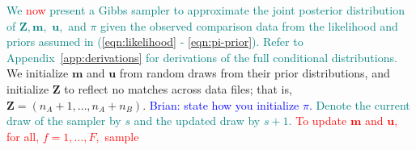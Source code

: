 \documentclass[ba]{imsart}
\begin{document}
\textcolor{teal}{We \textcolor{red}{now} present a Gibbs sampler to approximate the joint posterior distribution of $\bm{Z}, \bm{m},$ $\bm{u},$ and $\pi$ given the observed comparison data from the likelihood and priors assumed in (\ref{eqn:likelihood} - \ref{eqn:pi-prior}). 
Refer to Appendix~\ref{app:derivations} for derivations of the full conditional distributions.}
We initialize $\bm{m}$ and $\bm{u}$ from random draws from their prior distributions, and initialize $\bm{Z}$ to reflect no matches across data files; that is, $\bm{Z} = (n_A + 1, \ldots, n_A + n_B)$. \textcolor{blue}{Brian: state how you initialize $\pi$.} \textcolor{teal}{Denote the current draw of the sampler by $s$ and the updated draw by $s+1$.} \textcolor{red}{To update $\mathbf{m}$ and $\mathbf{u}$, for all, $f=1, \ldots, F,$ sample}



%
\end{document}
